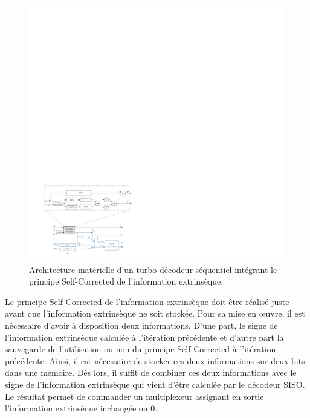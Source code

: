 \begin{figure}[!t]
	\centering
	\includegraphics[width=\textwidth]{main/ch2_fig/ipe/sc_arch4.pdf}
	\vspace*{.3cm}
	\caption{\label{fig:sc_arch}Architecture matérielle d'un turbo décodeur séquentiel intégrant le principe Self-Corrected de l'information 
	extrinsèque.}
\end{figure}

Le principe Self-Corrected de l’information extrinsèque doit être réalisé juste avant que l'information extrinsèque ne soit stockée. 
Pour sa mise en œuvre, il est nécessaire d'avoir à disposition deux informations. D'une part, le signe de l'information 
extrinsèque calculée à l'itération précédente et d'autre part la sauvegarde de l'utilisation ou non du principe Self-Corrected à 
l'itération précédente. Ainsi, il est nécessaire de stocker ces deux informations sur deux bits dans une mémoire. Dès lors, 
il suffit de combiner ces deux informations avec le signe de l'information extrinsèque qui vient d'être 
calculée par le décodeur SISO. Le résultat permet de commander un multiplexeur assignant en sortie l'information extrinsèque 
inchangée ou 0.

